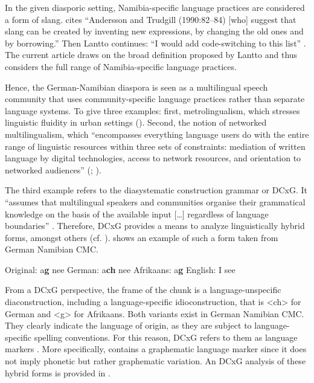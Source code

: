 \documentclass[output=paper]{langsci/langscibook}
\begin{document}
In the given diasporic setting, Namibia-specific language practices are considered a form of slang. \citet[634]{lantto_code-switching_2014} cites “Andersson and Trudgill (1990:82–84) [who] suggest that slang can be created by inventing new expressions, by changing the old ones and by borrowing.” Then Lantto continues: “I would add code-switching to this list” \citeyear[634]{lantto_code-switching_2014}. The current article draws on the broad definition proposed by Lantto and thus considers the full range of Namibia-specific language practices. 

Hence, the German-Namibian diaspora is seen as a multilingual speech community that uses community-specific language practices rather than separate language systems. To give three examples: first, metrolingualism, which stresses linguistic fluidity in urban settings (\citealt{otsuji_metrolingualism:_2010}). Second, the notion of networked multilingualism, which “encompasses everything language users do with the entire range of linguistic resources within three sets of constraints: mediation of written language by digital technologies, access to network resources, and orientation to networked audiences” (\citealt[185]{androutsopoulos_networked_2015}; \citealt{radke_urban_inpress}). 

The third example refers to the diasystematic construction grammar or DCxG. It “assumes that multilingual speakers and communities organise their grammatical knowledge on the basis of the available input […] regardless of language boundaries” \citep[2]{hoder_grammar_2018}. Therefore, DCxG provides a means to analyze linguistically hybrid forms, amongst others (cf. \citealt[23]{hoder_mehrsprachige_2018}).  shows an example of such a form taken from German Namibian CMC.


\ea
\label{ex:radke:1}
	\ea \label{ex:radke:1a} Original: a\textbf{g} nee 
	\ex \label{ex:radke:1b} German: a\textbf{ch} nee
	\ex \label{ex:radke:1c} Afrikaans: a\textbf{g}
	\ex \label{ex:radke:1d} English: I see
\z
\z

From a DCxG perspective, the frame of the chunk is a language-unspecific diaconstruction, including a language-specific idioconstruction, that is <ch> for German and <g> for Afrikaans. Both variants exist in German Namibian CMC. They clearly indicate the language of origin, as they are subject to language-specific spelling conventions. For this reason, DCxG refers to them as language markers \citep[23]{hoder_mehrsprachige_2018}. More specifically,  contains a graphematic language marker since it does not imply phonetic but rather graphematic variation. An DCxG analysis of these hybrid forms is provided in .
\end{document}
